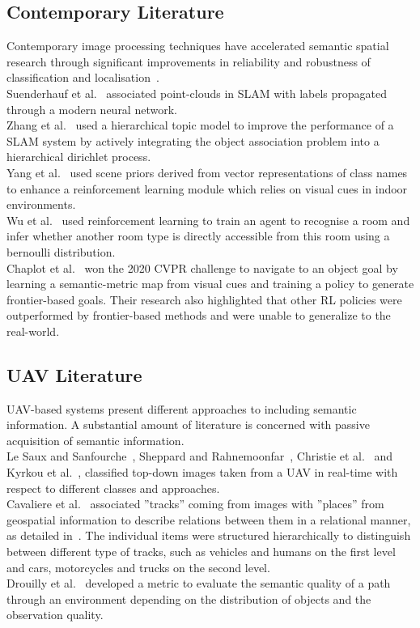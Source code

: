 \documentclass[twocolumn,letterpaper]{IEEEAerospaceCLS}  %
\begin{document}
\subsection{Contemporary Literature}
Contemporary image processing techniques have accelerated semantic spatial research through significant improvements in reliability and robustness of classification and localisation~\cite{alom_history_2018}.\\
Suenderhauf et al.~\cite{sunderhauf_meaningful_2017} associated point-clouds in SLAM with labels propagated through a modern neural network.\\
Zhang et al.~\cite{zhang_hierarchical_2019} used a hierarchical topic model to improve the performance of a SLAM system by actively integrating the object association problem into a hierarchical dirichlet process.\\
Yang et al.~\cite{yang_visual_2018} used scene priors derived from vector representations of class names to enhance a reinforcement learning module which relies on visual cues in indoor environments.\\
Wu et al.~\cite{wu_learning_2018} used reinforcement learning to train an agent to recognise a room and infer whether another room type is directly accessible from this room using a bernoulli distribution.\\
Chaplot et al.~\cite{chaplot_object_2020} won the 2020 CVPR challenge to navigate to an object goal by learning a semantic-metric map from visual cues and training a policy to generate frontier-based goals. Their research also highlighted that other RL policies were outperformed by frontier-based methods and were unable to generalize to the real-world.\\ 
\subsection{UAV Literature}
UAV-based systems present different approaches to including semantic information. A substantial amount of literature is concerned with passive acquisition of semantic information.\\
Le Saux and Sanfourche~\cite{saux_rapid_2013}, Sheppard and Rahnemoonfar~\cite{sheppard_real-time_2017}, Christie et al.~\cite{christie_semantics_2016} and Kyrkou et al.~\cite{kyrkou_dronet:_2018}, classified top-down images taken from a UAV in real-time with respect to different classes and approaches. \\
Cavaliere et al.~\cite{cavaliere_towards_2016,cavaliere_towards_2018} associated ''tracks'' coming from images with ''places'' from geospatial information to describe relations between them in a relational manner, as detailed in~\cite{landsiedel_review_2017}. The individual items were structured hierarchically to distinguish between different type of tracks, such as vehicles and humans on the first level and cars, motorcycles and trucks on the second level.\\
Drouilly et al.~\cite{drouilly_semantic_2015} developed a metric to evaluate the semantic quality of a path through an environment depending on the distribution of objects and the observation quality.
\end{document}
